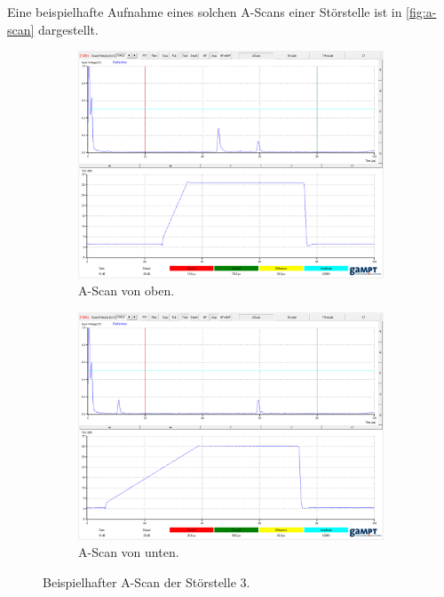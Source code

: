 Eine beispielhafte Aufnahme eines solchen A-Scans einer Störstelle ist in \autoref{fig:a-scan} dargestellt.
\begin{figure}
  \centering
  
  \begin{subfigure}{0.49\columnwidth}
  \centering
  \includegraphics[width=\textwidth]{pictures/o3.png}
  \caption{A-Scan von oben.}
  \label{fig:o3}
  \end{subfigure}
  \hfill
  \begin{subfigure}{0.49\columnwidth}
  \centering
  \includegraphics[width=\textwidth]{pictures/u3.png}
  \caption{A-Scan von unten.}
  \label{fig:u3}
  \end{subfigure}

  \caption{Beispielhafter A-Scan der Störstelle 3.}
  \label{fig:a-scan}
\end{figure}



